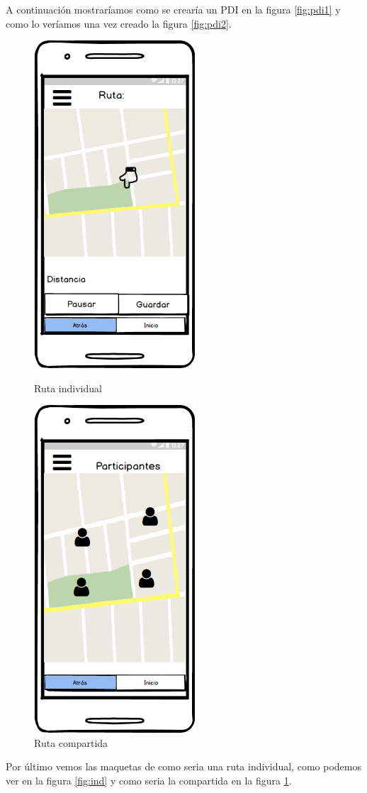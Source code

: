  A continuación mostraríamos como se crearía un PDI en la figura  \ref{fig:pdi1} y como lo veríamos una vez creado la figura \ref{fig:pdi2}.	

	\begin{figure}[H]
\begin{minipage}[b]{0.5\linewidth} %
\centering
\includegraphics[width=6cm]{maqueta/Trayecto-actual.png}

\caption{Ruta individual}
\label{fig:ind}
\end{minipage}
\hspace{0.5cm} %
\begin{minipage}[b]{0.5\linewidth}
\centering
\includegraphics[width=6cm]{maqueta/Trayecto-actual-compartido.png}

\caption{Ruta compartida}
\label{fig:comp}
\end{minipage}
\end{figure}

Por último vemos las maquetas de como seria una ruta individual, como podemos ver en la figura \ref{fig:ind} y como seria la compartida en la figura \ref{fig:comp}.
